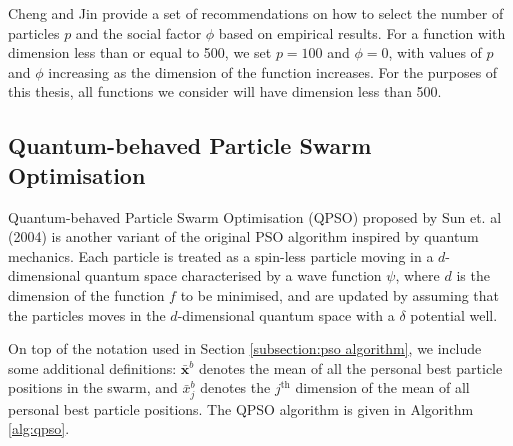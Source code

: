 \documentclass[12pt]{article}
\newcommand{\mb}[1]{\mathbf{#1}}
\theoremstyle{definition}
\begin{document}
Cheng and Jin provide a set of recommendations on how to select the number of particles $p$ and the social factor $\phi$ based on empirical results. For a function with dimension less than or equal to 500, we set $p = 100$ and $\phi = 0$, with values of $p$ and $\phi$ increasing as the dimension of the function increases. For the purposes of this thesis, all functions we consider will have dimension less than 500.

\subsection{Quantum-behaved Particle Swarm Optimisation}
Quantum-behaved Particle Swarm Optimisation (QPSO) proposed by Sun et. al (2004) \cite{sun2004} is another variant of the original PSO algorithm inspired by quantum mechanics. Each particle is treated as a spin-less particle moving in a $d$-dimensional quantum space characterised by a wave function $\psi$, where $d$ is the dimension of the function $f$ to be minimised, and are updated by assuming that the particles moves in the $d$-dimensional quantum space with a $\delta$ potential well.
\newline

On top of the notation used in Section \ref{subsection:pso algorithm}, we include some additional definitions: $\bar{\mb{x}}^b$ denotes the mean of all the personal best particle positions in the swarm, and $\bar{x}^b_j$ denotes the $j^\text{th}$ dimension of the mean of all personal best particle positions. The QPSO algorithm is given in Algorithm \ref{alg:qpso}.
\end{document}
